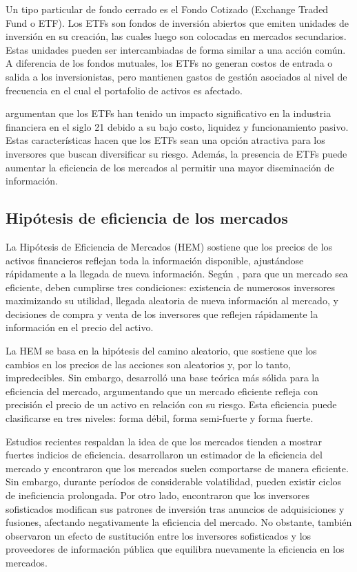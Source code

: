 \documentclass[a4paper,fleqn]{cas-sc}
\begin{document}
Un tipo particular de fondo cerrado es el Fondo Cotizado (Exchange Traded Fund o ETF). Los ETFs son fondos de inversión abiertos que emiten unidades de inversión en su creación, las cuales luego son colocadas en mercados secundarios. Estas unidades pueden ser intercambiadas de forma similar a una acción común. A diferencia de los fondos mutuales, los ETFs no generan costos de entrada o salida a los inversionistas, pero mantienen gastos de gestión asociados al nivel de frecuencia en el cual el portafolio de activos es afectado.

\cite{BenDavid} argumentan que los ETFs han tenido un impacto significativo en la industria financiera en el siglo 21 debido a su bajo costo, liquidez y funcionamiento pasivo. Estas características hacen que los ETFs sean una opción atractiva para los inversores que buscan diversificar su riesgo. Además, la presencia de ETFs puede aumentar la eficiencia de los mercados al permitir una mayor diseminación de información.

\subsection{Hipótesis de eficiencia de los mercados}
La Hipótesis de Eficiencia de Mercados (HEM) sostiene que los precios de los activos financieros reflejan toda la información disponible, ajustándose rápidamente a la llegada de nueva información. Según \cite{Reilly}, para que un mercado sea eficiente, deben cumplirse tres condiciones: existencia de numerosos inversores maximizando su utilidad, llegada aleatoria de nueva información al mercado, y decisiones de compra y venta de los inversores que reflejen rápidamente la información en el precio del activo.

La HEM se basa en la hipótesis del camino aleatorio, que sostiene que los cambios en los precios de las acciones son aleatorios y, por lo tanto, impredecibles. Sin embargo, \cite{fama1970} desarrolló una base teórica más sólida para la eficiencia del mercado, argumentando que un mercado eficiente refleja con precisión el precio de un activo en relación con su riesgo. Esta eficiencia puede clasificarse en tres niveles: forma débil, forma semi-fuerte y forma fuerte.

Estudios recientes respaldan la idea de que los mercados tienden a mostrar fuertes indicios de eficiencia. \cite{Tran} desarrollaron un estimador de la eficiencia del mercado y encontraron que los mercados suelen comportarse de manera eficiente. Sin embargo, durante períodos de considerable volatilidad, pueden existir ciclos de ineficiencia prolongada. Por otro lado, \cite{Yong} encontraron que los inversores sofisticados modifican sus patrones de inversión tras anuncios de adquisiciones y fusiones, afectando negativamente la eficiencia del mercado. No obstante, también observaron un efecto de sustitución entre los inversores sofisticados y los proveedores de información pública que equilibra nuevamente la eficiencia en los mercados.
\end{document}

